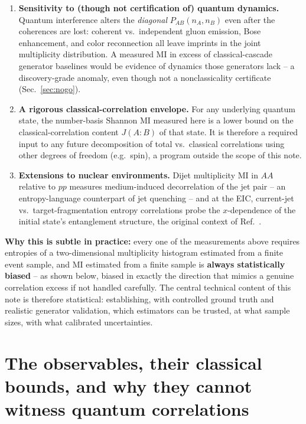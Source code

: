 \documentclass[11pt]{article}
\begin{document}
\begin{enumerate}
\item \textbf{Sensitivity to (though not certification of) quantum
dynamics.} Quantum interference alters the \emph{diagonal}
$P_{AB}(n_A,n_B)$ even after the coherences are lost: coherent vs.\
independent gluon emission, Bose enhancement, and color reconnection all
leave imprints in the joint multiplicity distribution. A measured MI in
excess of classical-cascade generator baselines would be evidence of
dynamics those generators lack -- a discovery-grade anomaly, even though
not a nonclassicality certificate (Sec.~\ref{sec:nogo}).

\item \textbf{A rigorous classical-correlation envelope.} For any
underlying quantum state, the number-basis Shannon MI measured here is a
lower bound on the classical-correlation content $J(A{:}B)$ of that
state. It is therefore a required input to any future decomposition of
total vs.\ classical correlations using other degrees of freedom (e.g.\
spin), a program outside the scope of this note.

\item \textbf{Extensions to nuclear environments.} Dijet multiplicity MI
in $AA$ relative to $pp$ measures medium-induced decorrelation of the jet
pair -- an entropy-language counterpart of jet quenching -- and at the
EIC, current-jet vs.\ target-fragmentation entropy correlations probe the
$x$-dependence of the initial state's entanglement structure, the
original context of Ref.~\cite{KL2017}.

\end{enumerate}

\textbf{Why this is subtle in practice:} every one of the measurements
above requires entropies of a two-dimensional multiplicity histogram
estimated from a finite event sample, and MI estimated from a finite
sample is \textbf{always statistically biased} -- as shown below, biased
in exactly the direction that mimics a genuine correlation excess if not
handled carefully. The central technical content of this note is
therefore statistical: establishing, with controlled ground truth and
realistic generator validation, which estimators can be trusted, at what
sample sizes, with what calibrated uncertainties.

\section{The observables, their classical bounds, and why they cannot
witness quantum correlations}
\label{sec:observable}
\end{document}
